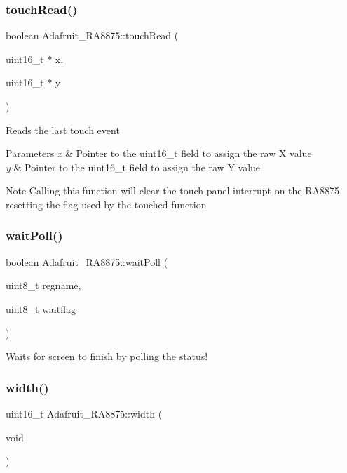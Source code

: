 \subsubsection{\texorpdfstring{touchRead()}{touchRead()}}
{\footnotesize\ttfamily boolean Adafruit\+\_\+\+R\+A8875\+::touch\+Read (\begin{DoxyParamCaption}\item[{uint16\+\_\+t $\ast$}]{x,  }\item[{uint16\+\_\+t $\ast$}]{y }\end{DoxyParamCaption})}

Reads the last touch event


\begin{DoxyParams}{Parameters}
{\em x} & Pointer to the uint16\+\_\+t field to assign the raw X value \\
\hline
{\em y} & Pointer to the uint16\+\_\+t field to assign the raw Y value\\
\hline
\end{DoxyParams}
\begin{DoxyNote}{Note}
Calling this function will clear the touch panel interrupt on the R\+A8875, resetting the flag used by the \textquotesingle{}touched\textquotesingle{} function 
\end{DoxyNote}
\mbox{\label{class_adafruit___r_a8875_ad926379389b044ab1aca6a3d4e2c5afd}} 
\subsubsection{\texorpdfstring{waitPoll()}{waitPoll()}}
{\footnotesize\ttfamily boolean Adafruit\+\_\+\+R\+A8875\+::wait\+Poll (\begin{DoxyParamCaption}\item[{uint8\+\_\+t}]{regname,  }\item[{uint8\+\_\+t}]{waitflag }\end{DoxyParamCaption})}

Waits for screen to finish by polling the status! \mbox{\label{class_adafruit___r_a8875_ad305a724603e1030ec1bfe1a67327ed5}} 
\subsubsection{\texorpdfstring{width()}{width()}}
{\footnotesize\ttfamily uint16\+\_\+t Adafruit\+\_\+\+R\+A8875\+::width (\begin{DoxyParamCaption}\item[{void}]{ }\end{DoxyParamCaption})}

